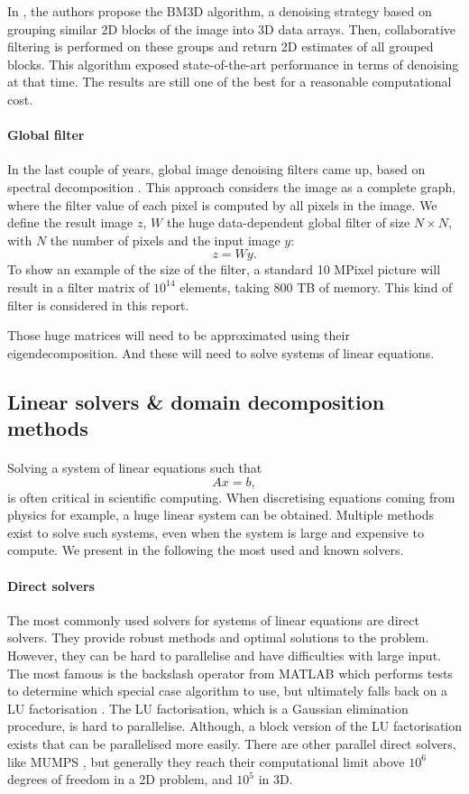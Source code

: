 In \cite{dabov_image_2007}, the authors propose the BM3D algorithm, a denoising strategy based on grouping similar 2D blocks of the image into 3D data arrays.
Then, collaborative filtering is performed on these groups and return 2D estimates of all grouped blocks.
This algorithm exposed state-of-the-art performance in terms of denoising at that time.
The results are still one of the best for a reasonable computational cost.

\paragraph{Global filter}
In the last couple of years, global image denoising filters came up, based on spectral decomposition \cite{glide_2014}.
This approach considers the image as a complete graph, where the filter value of each pixel is computed by all pixels in the image.
We define the result image \(z\), \(W\) the huge data-dependent global filter of size \(N \times N\), with \(N\) the number of pixels and the input image \(y\):
\[z = Wy.\]
To show an example of the size of the filter, a standard 10 MPixel picture will result in a filter matrix of \(10^{14}\) elements, taking 800 TB of memory.
This kind of filter is considered in this report.

Those huge matrices will need to be approximated using their eigendecomposition.
And these will need to solve systems of linear equations.

\subsection{Linear solvers \& domain decomposition methods}

\paragraph{}
Solving a system of linear equations such that
\[Ax = b,\]
is often critical in scientific computing.
When discretising equations coming from physics for example, a huge linear system can be obtained.
Multiple methods exist to solve such systems, even when the system is large and expensive to compute.
We present in the following the most used and known solvers.

\paragraph{Direct solvers}
The most commonly used solvers for systems of linear equations are direct solvers.
They provide robust methods and optimal solutions to the problem.
However, they can be hard to parallelise and have difficulties with large input.
The most famous is the backslash operator from MATLAB which performs tests to determine which special case algorithm to use, but ultimately falls back on a LU factorisation \cite{mldivide_matlab}.
The LU factorisation, which is a Gaussian elimination procedure, is hard to parallelise.
Although, a block version of the LU factorisation exists that can be parallelised more easily.
There are other parallel direct solvers, like MUMPS \cite{MUMPS_2001}, but generally they reach their computational limit above \(10^6\) degrees of freedom in a 2D problem, and \(10^5\) in 3D.


